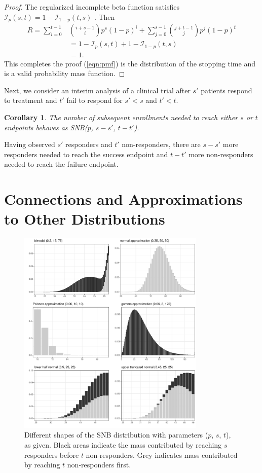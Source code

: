 \documentclass[12pt]{article}
\newtheorem{corollary}{Corollary}
\begin{document}
\begin{proof}
The regularized incomplete beta function satisfies
$\mathcal{I}_p(s, t) = 1-\mathcal{I}_{1-p}(t, s)$ \citep{Uppuluri1967}. Then
\begin{align*}
R = \sum_{i=0}^{t-1} &{i+s-1 \choose i} p^s (1-p)^i +
\sum_{j=0}^{s-1}  {j+t-1 \choose j} p^j  (1-p)^t \\
   &= 1-\mathcal{I}_p(s, t) + 1 - \mathcal{I}_{1-p}(t, s) \\
   &= 1. 
\end{align*}
This completes the proof (\ref{eqn:pmf}) is the distribution of the
stopping time and is a valid probability mass function.
\end{proof}

Next, we consider an interim analysis of a clinical trial after $s'$ 
patients respond to treatment 
and $t'$ fail to respond for $s' < s$ and $t' < t$.
\begin{corollary} \label{conditional_distribution}
The number of subsequent enrollments needed 
to reach either $s$ or $t$ endpoints behaves as SNB($p$, $s-s'$, $t-t'$).
\end{corollary}
Having observed $s'$ responders and $t'$ non-responders, there are $s-s'$ 
more responders needed to reach the success endpoint and $t-t'$ more 
non-responders needed to reach the failure endpoint.

\section{Connections and Approximations to Other Distributions}

\begin{figure}[p!]
\begin{center}
\includegraphics[width=0.8\textwidth]{shapes.pdf}
\end{center}
\caption{Different shapes of the SNB distribution with parameters 
($p$, $s$, $t$), as given. Black areas indicate the mass contributed by reaching
$s$ responders before $t$ non-responders. Grey indicates
mass contributed by reaching $t$ non-responders first. \label{shapes.fig}}
\end{figure}
\end{document}
